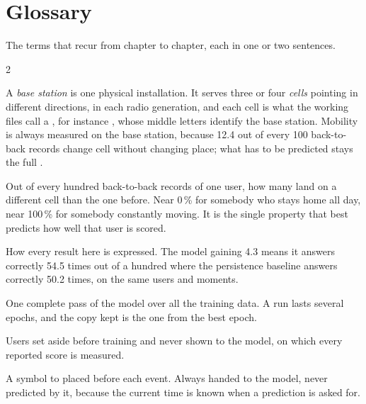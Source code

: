\chapter{Glossary}
\label{app:glossary}

The terms that recur from chapter to chapter, each in one or two sentences.

\begin{multicols}{2}
\small
\begin{description}[style=unboxed,leftmargin=0pt,labelindent=0pt,labelsep=0.4em,
                    itemsep=2.5pt,parsep=0pt]

\item[Base station, cell, \cid{cell\_id}.] A \emph{base station} is one physical
  installation. It serves three or four \emph{cells} pointing in different
  directions, in each radio generation, and each cell is what the working files
  call a , for instance , whose middle letters
  identify the base station. Mobility is always measured on the base station,
  because 12.4 out of every 100 back-to-back records change cell without
  changing place; what has to be predicted stays the full .

\item[Cell-switch rate.] Out of every hundred back-to-back records of one user,
  how many land on a different cell than the one before. Near 0\,\% for
  somebody who stays home all day, near 100\,\% for somebody constantly moving.
  It is the single property that best predicts how well that user is scored.

\item[Correct answers per hundred.] How every result here is expressed. The model
  gaining 4.3 means it answers correctly 54.5 times out of a hundred where the
  persistence baseline answers correctly 50.2 times, on the same users and moments.

\item[Epoch.] One complete pass of the model over all the training data. A run
  lasts several epochs, and the copy kept is the one from the best epoch.

\item[Held-out users.] Users set aside before training and never shown to the
  model, on which every reported score is measured.

\item[Hour symbol.] A symbol  to  placed before each event.
  Always handed to the model, never predicted by it, because the current time is
  known when a prediction is asked for.


\end{description}
\end{multicols}
